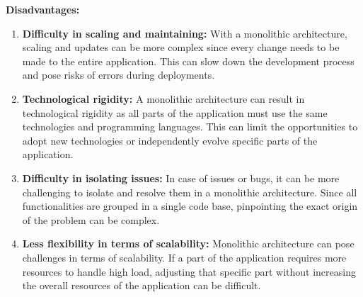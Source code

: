 \textbf{Disadvantages:}
\begin{enumerate}
\item \textbf{Difficulty in scaling and maintaining:} With a monolithic architecture, scaling and updates can be more complex since every change needs to be made to the entire application. This can slow down the development process and pose risks of errors during deployments.
\item \textbf{Technological rigidity:} A monolithic architecture can result in technological rigidity as all parts of the application must use the same technologies and programming languages. This can limit the opportunities to adopt new technologies or independently evolve specific parts of the application.
\item \textbf{Difficulty in isolating issues:} In case of issues or bugs, it can be more challenging to isolate and resolve them in a monolithic architecture. Since all functionalities are grouped in a single code base, pinpointing the exact origin of the problem can be complex.
\item \textbf{Less flexibility in terms of scalability:} Monolithic architecture can pose challenges in terms of scalability. If a part of the application requires more resources to handle high load, adjusting that specific part without increasing the overall resources of the application can be difficult.
\end{enumerate}

